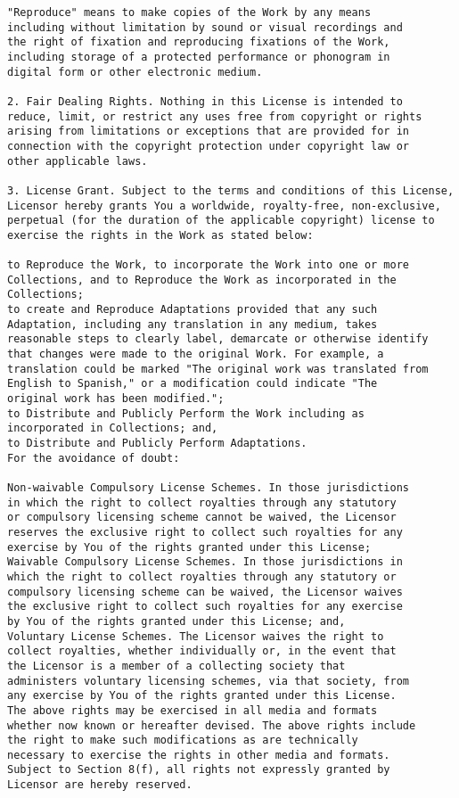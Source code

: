 \begin{verbatim}
"Reproduce" means to make copies of the Work by any means
including without limitation by sound or visual recordings and
the right of fixation and reproducing fixations of the Work,
including storage of a protected performance or phonogram in
digital form or other electronic medium.

2. Fair Dealing Rights. Nothing in this License is intended to
reduce, limit, or restrict any uses free from copyright or rights
arising from limitations or exceptions that are provided for in
connection with the copyright protection under copyright law or
other applicable laws.

3. License Grant. Subject to the terms and conditions of this License,
Licensor hereby grants You a worldwide, royalty-free, non-exclusive,
perpetual (for the duration of the applicable copyright) license to
exercise the rights in the Work as stated below:

to Reproduce the Work, to incorporate the Work into one or more
Collections, and to Reproduce the Work as incorporated in the
Collections;
to create and Reproduce Adaptations provided that any such
Adaptation, including any translation in any medium, takes
reasonable steps to clearly label, demarcate or otherwise identify
that changes were made to the original Work. For example, a
translation could be marked "The original work was translated from
English to Spanish," or a modification could indicate "The
original work has been modified.";
to Distribute and Publicly Perform the Work including as
incorporated in Collections; and,
to Distribute and Publicly Perform Adaptations.
For the avoidance of doubt:

Non-waivable Compulsory License Schemes. In those jurisdictions
in which the right to collect royalties through any statutory
or compulsory licensing scheme cannot be waived, the Licensor
reserves the exclusive right to collect such royalties for any
exercise by You of the rights granted under this License;
Waivable Compulsory License Schemes. In those jurisdictions in
which the right to collect royalties through any statutory or
compulsory licensing scheme can be waived, the Licensor waives
the exclusive right to collect such royalties for any exercise
by You of the rights granted under this License; and,
Voluntary License Schemes. The Licensor waives the right to
collect royalties, whether individually or, in the event that
the Licensor is a member of a collecting society that
administers voluntary licensing schemes, via that society, from
any exercise by You of the rights granted under this License.
The above rights may be exercised in all media and formats
whether now known or hereafter devised. The above rights include
the right to make such modifications as are technically
necessary to exercise the rights in other media and formats.
Subject to Section 8(f), all rights not expressly granted by
Licensor are hereby reserved.


\end{verbatim}
